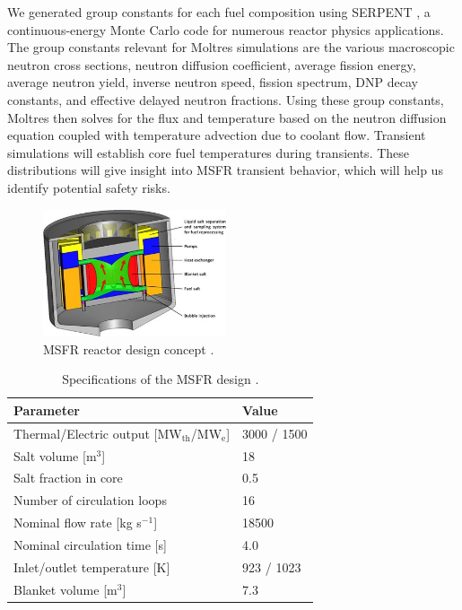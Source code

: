 \documentclass{anstrans}
\begin{document}
    We generated group constants for 
    each fuel composition using SERPENT \cite{leppanen_serpent_2015}, a 
    continuous-energy Monte Carlo code for numerous reactor physics 
    applications. The group constants relevant for Moltres simulations are
    the various macroscopic neutron cross sections, neutron diffusion
    coefficient, average fission energy, average neutron yield, inverse
    neutron speed, fission spectrum, \gls{DNP} decay constants, and effective
    delayed neutron fractions.
    Using these group constants, Moltres then 
    solves for the flux and temperature based on the neutron diffusion 
    equation coupled with temperature advection due to coolant flow. Transient 
    simulations will establish core fuel temperatures during transients.
    These distributions will give insight into \gls{MSFR} transient behavior,
    which will help us identify potential safety risks.
    
\begin{figure}[h] 
	\centering
	\includegraphics[width=0.48\textwidth]{./figures/MSFR}
	\caption{MSFR reactor design concept \cite{serp_molten_2014}.}
	\label{fig:msfr}
\end{figure} 

\begin{table}[h]
	\caption{Specifications of the \gls{MSFR} design \cite{serp_molten_2014}.}
	\begin{tabular}{ l l }
		\hline
		Parameter & Value \\
		\hline
		Thermal/Electric output [MW$_{\text{th}}$/MW$_{\text{e}}$] & 3000 /
		1500 
		\\
		Salt volume [m$^3$] & 18 \\
		Salt fraction in core & 0.5 \\
		Number of circulation loops & 16 \\
		Nominal flow rate [kg s$^{-1}$] & 18500  \\
		Nominal circulation time [s] & 4.0 \\
		Inlet/outlet temperature [K] & 923 / 1023 \\
		Blanket volume [m$^3$] & 7.3\\
		\hline
	\end{tabular}
	\label{table:msfr}
\end{table}
\end{document}
